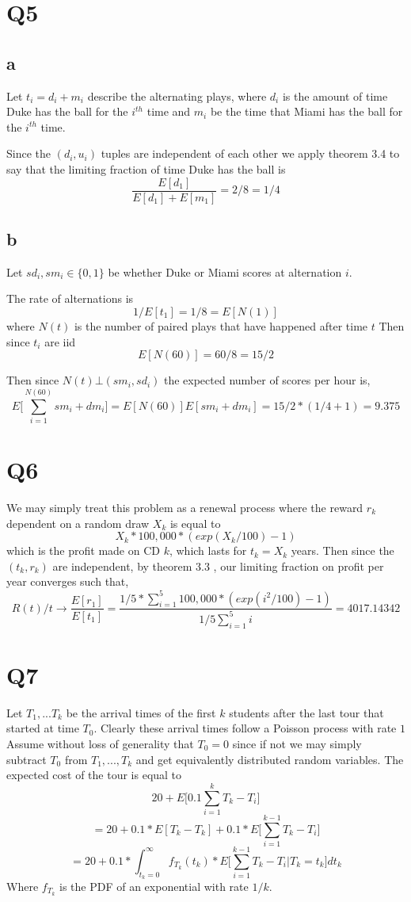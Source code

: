 \documentclass{article}
\begin{document}
\section*{Q5}
\subsection*{a}
Let $t_i = d_i + m_i$ describe the alternating plays, where $d_i$ is the amount of time Duke has the ball for the $i^{th}$ time and $m_i$ be the time that Miami has the ball for the $i^{th}$ time. 

Since the $(d_i,u_i)$ tuples are independent of each other we apply theorem 3.4 to say that the limiting fraction of time Duke has the ball is
$$
\frac{E[d_1]}{E[d_1] + E[m_1]} = 2 / 8 = 1/4
$$

\subsection*{b}


Let $sd_i, sm_i \in \{0,1\}$ be whether Duke or Miami scores at alternation $i$.

The rate of alternations is 
$$
1/E[t_1] = 1/8 = E[N(1)]
$$
where $N(t)$ is the number of paired plays that have happened after time $t$
Then since $t_i$ are iid
$$
E[N(60)] = 60/8 = 15/2
$$

Then since $N(t) \bot (sm_i, sd_i)$ the expected number of scores per hour is,
$$
E \bigg[\sum_{i=1}^{N(60)} sm_i + dm_i \bigg] = E[N(60)]E[sm_i + dm_i] = 15/2 * (1/4 + 1) = 9.375
$$

\section*{Q6}
We may simply treat this problem as a renewal process where the reward $r_k$
dependent on a random draw $X_k$ is equal to
$$
X_k * 100,000 * (exp(X_k/100) - 1)
$$
which is the profit made on CD $k$, which lasts for $t_k = X_k$ years. 
Then since the $(t_k, r_k)$ are independent, by theorem 3.3 , our limiting fraction on profit per year converges such that,
$$
R(t)/t \to \frac{E[r_1]}{E[t_1]} = \frac{1/5 *\sum_{i = 1}^5  100,000 * (exp(i^2/100) - 1)}{1/5 \sum_{i=1}^5 i} =  4017.14342
$$

\section*{Q7}
Let $T_1, ... T_k$ be the arrival times of the first $k$ students after the last tour that started at time $T_0$. Clearly these arrival times follow a Poisson process with rate $1$ 
Assume without loss of generality that $T_0 = 0$ since if not we may simply subtract $T_0$ from $T_1, ... , T_k$ and get equivalently distributed random variables. 
The expected cost of the tour is equal to 
$$
20 + E\bigg[ 0.1 \sum_{i = 1}^k T_k - T_i \bigg]
$$
$$
= 20 + 0.1*E[T_k - T_k] + 0.1*E\bigg[ \sum_{i = 1}^{k-1} T_k - T_i \bigg]
$$
$$
= 20 + 0.1 * \int_{t_k = 0} ^ \infty f_{T_k}(t_k) * E\bigg[ \sum_{i = 1}^{k-1} T_k - T_i \bigg| T_k = t_k\bigg] dt_k
$$
Where $f_{T_k}$ is the PDF of an exponential with rate $1/k$.
\end{document}
